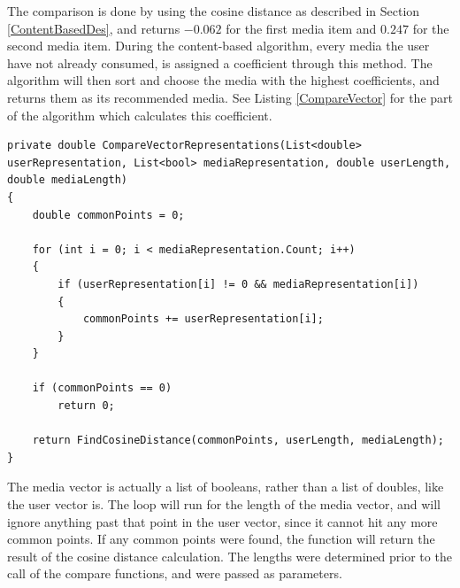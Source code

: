 The comparison is done by using the cosine distance as described in Section \ref{ContentBasedDes}, and returns $-0.062$ for the first media item and $0.247$ for the second media item. During the content-based algorithm, every media the user have not already consumed, is assigned a coefficient through this method. The algorithm will then sort and choose the media with the highest coefficients, and returns them as its recommended media. See Listing \ref{CompareVector} for the part of the algorithm which calculates this coefficient.
\newpage
\begin{lstlisting}[caption={The CompareVectorRepresentations method},label={CompareVector}]
private double CompareVectorRepresentations(List<double> userRepresentation, List<bool> mediaRepresentation, double userLength, double mediaLength)
{
	double commonPoints = 0;

	for (int i = 0; i < mediaRepresentation.Count; i++)
	{
		if (userRepresentation[i] != 0 && mediaRepresentation[i])
		{
			commonPoints += userRepresentation[i];
		}
	}

	if (commonPoints == 0)
		return 0;

	return FindCosineDistance(commonPoints, userLength, mediaLength);
}
\end{lstlisting}

The media vector is actually a list of booleans, rather than a list of doubles, like the user vector is. The loop will run for the length of the media vector, and will ignore anything past that point in the user vector, since it cannot hit any more common points. If any common points were found, the function will return the result of the cosine distance calculation. The lengths were determined prior to the call of the compare functions, and were passed as parameters.